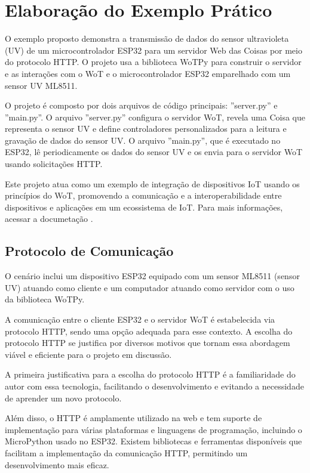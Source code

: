 \section{Elaboração do Exemplo Prático}

O exemplo proposto demonstra a transmissão de dados do sensor ultravioleta (UV) de um microcontrolador ESP32 para um servidor Web das Coisas por meio do protocolo HTTP. O projeto usa a biblioteca WoTPy para construir o servidor e as interações com o WoT e o microcontrolador ESP32 emparelhado com um sensor UV ML8511.

O projeto é composto por dois arquivos de código principais: ''server.py'' e ''main.py''. O arquivo ''server.py'' configura o servidor WoT, revela uma Coisa que representa o sensor UV e define controladores personalizados para a leitura e gravação de dados do sensor UV. O arquivo ''main.py'', que é executado no ESP32, lê periodicamente os dados do sensor UV e os envia para o servidor WoT usando solicitações HTTP.

Este projeto atua como um exemplo de integração de dispositivos IoT usando os princípios do WoT, promovendo a comunicação e a interoperabilidade entre dispositivos e aplicações em um ecossistema de IoT. Para mais informações, acessar a documetação \cite{gitwotpy:read}.

\subsection{Protocolo de Comunicação}

O cenário inclui um dispositivo ESP32 equipado com um sensor ML8511 (sensor UV) atuando como cliente e um computador atuando como servidor com o uso da biblioteca WoTPy.

A comunicação entre o cliente ESP32 e o servidor WoT é estabelecida via protocolo HTTP, sendo uma opção adequada para esse contexto. A escolha do protocolo HTTP se justifica por diversos motivos que tornam essa abordagem viável e eficiente para o projeto em discussão.

A primeira justificativa para a escolha do protocolo HTTP é a familiaridade do autor com essa tecnologia, facilitando o desenvolvimento e evitando a necessidade de aprender um novo protocolo.

Além disso, o HTTP é amplamente utilizado na web e tem suporte de implementação para várias plataformas e linguagens de programação, incluindo o MicroPython usado no ESP32. Existem bibliotecas e ferramentas disponíveis que facilitam a implementação da comunicação HTTP, permitindo um desenvolvimento mais eficaz.

